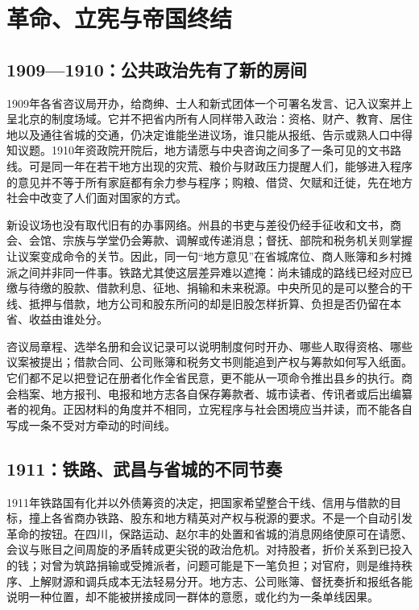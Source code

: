 \chapter{革命、立宪与帝国终结}
\label{ch:revolution-and-empire-end}



\section{1909—1910：公共政治先有了新的房间}

1909年各省咨议局开办，给商绅、士人和新式团体一个可署名发言、记入议案并上呈北京的制度场域。它并不把省内所有人同样带入政治：资格、财产、教育、居住地以及通往省城的交通，仍决定谁能坐进议场，谁只能从报纸、告示或熟人口中得知议题。1910年资政院开院后，地方请愿与中央咨询之间多了一条可见的文书路线。可是同一年在若干地方出现的灾荒、粮价与财政压力提醒人们，能够进入程序的意见并不等于所有家庭都有余力参与程序；购粮、借贷、欠赋和迁徙，先在地方社会中改变了人们面对国家的方式。

新设议场也没有取代旧有的办事网络。州县的书吏与差役仍经手征收和文书，商会、会馆、宗族与学堂仍会筹款、调解或传递消息；督抚、部院和税务机关则掌握让议案变成命令的关节。因此，同一句“地方意见”在省城席位、商人账簿和乡村摊派之间并非同一件事。铁路尤其使这层差异难以遮掩：尚未铺成的路线已经对应已缴与待缴的股款、借款利息、征地、捐输和未来税源。中央所见的是可以整合的干线、抵押与借款，地方公司和股东所问的却是旧股怎样折算、负担是否仍留在本省、收益由谁处分。

咨议局章程、选举名册和会议记录可以说明制度何时开办、哪些人取得资格、哪些议案被提出；借款合同、公司账簿和税务文书则能追到产权与筹款如何写入纸面。它们都不足以把登记在册者化作全省民意，更不能从一项命令推出县乡的执行。商会档案、地方报刊、电报和地方志各自保存筹款者、城市读者、传讯者或后出编纂者的视角。正因材料的角度并不相同，立宪程序与社会困境应当并读，而不能各自写成一条不受对方牵动的时间线。

\section{1911：铁路、武昌与省城的不同节奏}

1911年铁路国有化并以外债筹资的决定，把国家希望整合干线、信用与借款的目标，撞上各省商办铁路、股东和地方精英对产权与税源的要求。不是一个自动引发革命的按钮。在四川，保路运动、赵尔丰的处置和省城的消息网络使原可在请愿、会议与账目之间周旋的矛盾转成更尖锐的政治危机。对持股者，折价关系到已投入的钱；对曾为筑路捐输或受摊派者，问题可能是下一笔负担；对官府，则是维持秩序、上解财源和调兵成本无法轻易分开。地方志、公司账簿、督抚奏折和报纸各能说明一种位置，却不能被拼接成同一群体的意愿，或化约为一条单线因果。

